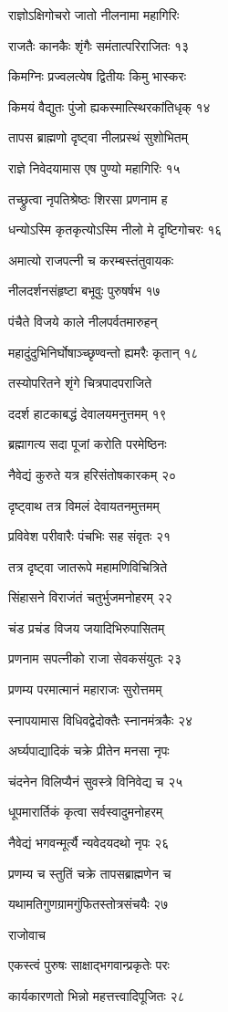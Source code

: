 राज्ञोऽक्षिगोचरो जातो नीलनामा महागिरिः

राजतैः कानकैः शृंगैः समंतात्परिराजितः १३

किमग्निः प्रज्वलत्येष द्वितीयः किमु भास्करः

किमयं वैद्युतः पुंजो ह्यकस्मात्स्थिरकांतिधृक् १४

तापस ब्राह्मणो दृष्ट्वा नीलप्रस्थं सुशोभितम्

राज्ञे निवेदयामास एष पुण्यो महागिरिः १५

तच्छ्रुत्वा नृपतिश्रेष्ठः शिरसा प्रणनाम ह

धन्योऽस्मि कृतकृत्योऽस्मि नीलो मे दृष्टिगोचरः १६

अमात्यो राजपत्नी च करम्बस्तंतुवायकः

नीलदर्शनसंहृष्टा बभूवुः पुरुषर्षभ १७

पंचैते विजये काले नीलपर्वतमारुहन्

महादुंदुभिनिर्घोषाञ्च्छृण्वन्तो ह्यमरैः कृतान् १८

तस्योपरितने शृंगे चित्रपादपराजिते

ददर्श हाटकाबद्धं देवालयमनुत्तमम् १९

ब्रह्मागत्य सदा पूजां करोति परमेष्ठिनः

नैवेद्यं कुरुते यत्र हरिसंतोषकारकम् २०

दृष्ट्वाथ तत्र विमलं देवायतनमुत्तमम्

प्रविवेश परीवारैः पंचभिः सह संवृतः २१

तत्र दृष्ट्वा जातरूपे महामणिविचित्रिते

सिंहासने विराजंतं चतुर्भुजमनोहरम् २२

चंड प्रचंड विजय जयादिभिरुपासितम्

प्रणनाम सपत्नीको राजा सेवकसंयुतः २३

प्रणम्य परमात्मानं महाराजः सुरोत्तमम्

स्नापयामास विधिवद्वेदोक्तैः स्नानमंत्रकैः २४

अर्घ्यपाद्यादिकं चक्रे प्रीतेन मनसा नृपः

चंदनेन विलिप्यैनं सुवस्त्रे विनिवेद्य च २५

धूपमारार्तिकं कृत्वा सर्वस्वादुमनोहरम्

नैवेद्यं भगवन्मूर्त्यै न्यवेदयदथो नृपः २६

प्रणम्य च स्तुतिं चक्रे तापसब्राह्मणेन च

यथामतिगुणग्रामगुंफितस्तोत्रसंचयैः २७

राजोवाच

एकस्त्वं पुरुषः साक्षाद्भगवान्प्रकृतेः परः

कार्यकारणतो भिन्नो महत्तत्त्वादिपूजितः २८

